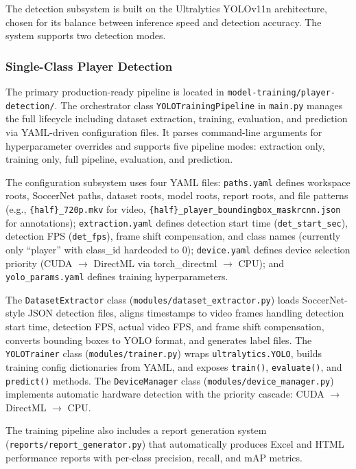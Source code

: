 \documentclass[10pt,twocolumn,a4paper]{article}
\begin{document}
The detection subsystem is built on the Ultralytics YOLOv11n architecture, chosen for its balance between inference speed and detection accuracy. The system supports two detection modes.

\subsubsection{Single-Class Player Detection}
The primary production-ready pipeline is located in \texttt{model-training/player-detection/}. The orchestrator class \texttt{YOLOTrainingPipeline} in \texttt{main.py} manages the full lifecycle including dataset extraction, training, evaluation, and prediction via YAML-driven configuration files. It parses command-line arguments for hyperparameter overrides and supports five pipeline modes: extraction only, training only, full pipeline, evaluation, and prediction.

The configuration subsystem uses four YAML files: \texttt{paths.yaml} defines workspace roots, SoccerNet paths, dataset roots, model roots, report roots, and file patterns (e.g., \texttt{\{half\}\_720p.mkv} for video, \texttt{\{half\}\_player\_boundingbox\_maskrcnn.json} for annotations); \texttt{extraction.yaml} defines detection start time (\texttt{det\_start\_sec}), detection FPS (\texttt{det\_fps}), frame shift compensation, and class names (currently only ``player'' with class\_id hardcoded to 0); \texttt{device.yaml} defines device selection priority (CUDA $\rightarrow$ DirectML via torch\_directml $\rightarrow$ CPU); and \texttt{yolo\_params.yaml} defines training hyperparameters.

The \texttt{DatasetExtractor} class (\texttt{modules/dataset\_extractor.py}) loads SoccerNet-style JSON detection files, aligns timestamps to video frames handling detection start time, detection FPS, actual video FPS, and frame shift compensation, converts bounding boxes to YOLO format, and generates label files. The \texttt{YOLOTrainer} class (\texttt{modules/trainer.py}) wraps \texttt{ultralytics.YOLO}, builds training config dictionaries from YAML, and exposes \texttt{train()}, \texttt{evaluate()}, and \texttt{predict()} methods. The \texttt{DeviceManager} class (\texttt{modules/device\_manager.py}) implements automatic hardware detection with the priority cascade: CUDA $\rightarrow$ DirectML $\rightarrow$ CPU.

The training pipeline also includes a report generation system (\texttt{reports/report\_generator.py}) that automatically produces Excel and HTML performance reports with per-class precision, recall, and mAP metrics.
\end{document}
